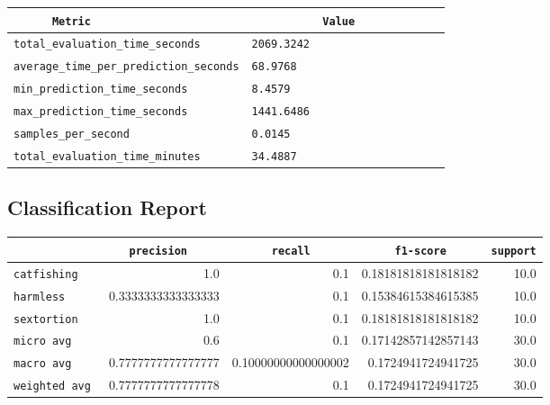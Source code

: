 \documentclass{article}
\begin{document}
\begin{center}
\begin{tabular}{l | l} \hline
    \verb|      Metric     | & \verb|           Value           | \\ \hline
    \hline
    \verb|total_evaluation_time_seconds| & \verb|2069.3242                    | \\ \hline
    \verb|average_time_per_prediction_seconds| & \verb|68.9768                      | \\ \hline
    \verb|min_prediction_time_seconds| & \verb|8.4579                       | \\ \hline
    \verb|max_prediction_time_seconds| & \verb|1441.6486                    | \\ \hline
    \verb|samples_per_second| & \verb|0.0145                       | \\ \hline
    \verb|total_evaluation_time_minutes| & \verb|34.4887                      | \\ \hline
\end{tabular}
\end{center}

\subsection{Classification Report}

\begin{center}
\begin{tabular}{l | r | r | r | r} \hline
    \verb|            | & \verb|    precision     | & \verb|      recall      | & \verb|     f1-score     | & \verb|support| \\ \hline
    \hline
    \verb|catfishing | & 1.0 & 0.1 & 0.18181818181818182 &    10.0 \\ \hline
    \verb|harmless   | & 0.3333333333333333 & 0.1 & 0.15384615384615385 &    10.0 \\ \hline
    \verb|sextortion | & 1.0 & 0.1 & 0.18181818181818182 &    10.0 \\ \hline
    \verb|micro avg  | & 0.6 & 0.1 & 0.17142857142857143 &    30.0 \\ \hline
    \verb|macro avg  | & 0.7777777777777777 & 0.10000000000000002 & 0.1724941724941725 &    30.0 \\ \hline
    \verb|weighted avg| & 0.7777777777777778 & 0.1 & 0.1724941724941725 &    30.0 \\ \hline
\end{tabular}
\end{center}
\end{document}
